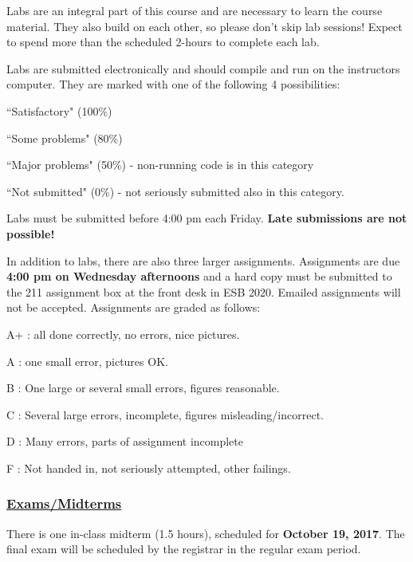 \documentclass[12pt]{article}
\renewcommand{\section}[1]{\vspace{0pt}\subsubsection*{\underline{\large #1}}\vspace{-10pt}}
\newcounter{lnum}
\newenvironment{abbrevlist}%
  {\begin{list}{ }{\setlength{\leftmargin}{1em}%
               \setlength{\itemindent}{3em}%
               \setlength{\itemsep}{0pt}%
               \setlength{\parsep}{0pt}%
               \setlength{\topsep}{2pt}%
               \usecounter{lnum} } }{\end{list}}
\begin{document}
Labs are an integral part of this course and are necessary to learn the course material. They also build on each other, so please don't skip lab sessions! Expect to spend more than the scheduled 2-hours to complete each lab.

Labs are submitted electronically and should compile and run on the instructors computer. They are marked with one of the  following 4 possibilities: 

\begin{abbrevlist}
\item ``Satisfactory" (100\%)
\item ``Some problems" (80\%)
\item ``Major problems" (50\%) - non-running code is in this category
\item ``Not submitted" (0\%) - not seriously submitted also in this category.
\end{abbrevlist}

Labs must be submitted before 4:00 pm each Friday. {\bf Late submissions are not possible!}

In addition to labs, there are also three larger assignments. Assignments
are due {\bf 4:00 pm on Wednesday afternoons} and a hard copy must be submitted to the 211 assignment box at the front desk in ESB 2020. Emailed assignments will not 
be accepted. Assignments are graded as follows:
\begin{abbrevlist}
\item[A+] : all done correctly, no errors, nice pictures.
\item[A] : one small error, pictures OK.
\item[B] : One large or several small errors, figures reasonable.
\item[C] : Several large errors, incomplete, figures 
          misleading/incorrect.
\item[D] : Many errors, parts of assignment incomplete
\item[F] : Not handed in, not seriously attempted, other failings.
\end{abbrevlist}

\section{Exams/Midterms}

There is one in-class midterm (1.5 hours), scheduled for {\bf October 19, 2017}. The final exam will be scheduled by the registrar in the regular exam period.
\end{document}
